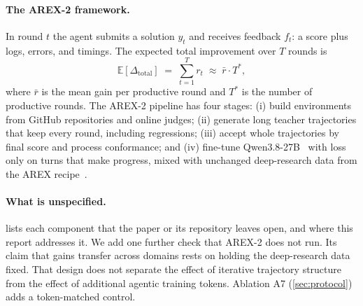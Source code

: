 \documentclass[11pt]{article}
\begin{document}
\paragraph{The AREX-2 framework.}
In round $t$ the agent submits a solution $y_t$ and receives feedback $f_t$: a score plus logs, errors, and timings. The expected total improvement over $T$ rounds is
\begin{equation}
  \mathbb{E}[\Delta_{\text{total}}] \;=\; \sum_{t=1}^{T} r_t \;\approx\; \bar{r}\cdot T^{*},
  \label{eq:decomp}
\end{equation}
where $\bar{r}$ is the mean gain per productive round and $T^{*}$ is the number of productive rounds. The AREX-2 pipeline has four stages: (i) build environments from GitHub repositories and online judges; (ii) generate long teacher trajectories that keep every round, including regressions; (iii) accept whole trajectories by final score and process conformance; and (iv) fine-tune Qwen3.8-27B~\citep{qwen2026qwen38} with loss only on turns that make progress, mixed with unchanged deep-research data from the AREX recipe~\citep{lu2026arex}.

\paragraph{What is unspecified.}
 lists each component that the paper or its repository leaves open, and where this report addresses it. We add one further check that AREX-2 does not run. Its claim that gains transfer across domains rests on holding the deep-research data fixed. That design does not separate the effect of iterative trajectory structure from the effect of additional agentic training tokens. Ablation A7 (\cref{sec:protocol}) adds a token-matched control.
\end{document}
